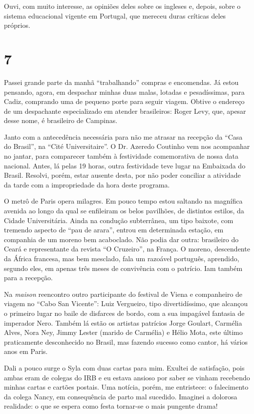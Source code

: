 Ouvi, com muito interesse, as opiniões deles sobre os ingleses e, depois, sobre o sistema educacional vigente em Portugal, que mereceu duras críticas deles próprios.

\section*{7 \adfflatleafright {}}
Passei grande parte da manhã ``trabalhando'' compras e encomendas. Já estou pensando, agora, em despachar minhas duas malas, lotadas e pesadíssimas, para Cadiz, comprando uma de pequeno porte para seguir viagem. Obtive o endereço de um despachante especializado em atender brasileiros: Roger Levy, que, apesar desse nome, é brasileiro de Campinas.

Janto com a antecedência necessária para não me atrasar na recepção da ``Casa do Brasil'', na ``Cité Universitaire''. O Dr. Azeredo Coutinho vem nos acompanhar no jantar, para comparecer também à festividade comemorativa de nossa data nacional. Antes, lá pelas 19 horas, outra festividade teve lugar na Embaixada do Brasil. Resolvi, porém, estar ausente desta, por não poder conciliar a atividade da tarde com a impropriedade da hora deste programa.

O metrô de Paris opera milagres. Em pouco tempo estou saltando na magnífica avenida ao longo da qual se enfileiram os belos pavilhões, de distintos estilos, da Cidade Universitária. Ainda na condução subterrânea, um tipo baixote, com tremendo aspecto de ``pau de arara'', entrou em determinada estação, em companhia de um moreno bem acaboclado. Não podia dar outra: brasileiro do Ceará e representante da revista ``O Cruzeiro'', na França. O moreno, descendente da África francesa, mas bem mesclado, fala um razoável português, aprendido, segundo eles, em apenas três meses de convivência com o patrício. Iam também para a recepção.

Na \textit{maison} reencontro outro participante do festival de Viena e companheiro de viagem no ``Cabo San Vicente'': Luiz Vergueiro, tipo divertidíssimo, que alcançou o primeiro lugar no baile de disfarces de bordo, com a sua impagável fantasia de imperador Nero. Também lá estão os artistas patrícios Jorge Goulart, Carmélia Alves, Nora Ney, Jimmy Lester (marido de Carmélia) e Hélio Mota, este último praticamente desconhecido no Brasil, mas fazendo sucesso como cantor, há vários anos em Paris.

Dali a pouco surge o Syla com duas cartas para mim. Exultei de satisfação, pois ambas eram de colegas do IRB e eu estava ansioso por saber se vinham recebendo minhas cartas e cartões postais. Uma notícia, porém, me entristece: o falecimento da colega Nancy, em consequência de parto mal sucedido. Imaginei a dolorosa realidade: o que se espera como festa tornar-se o mais pungente drama!

